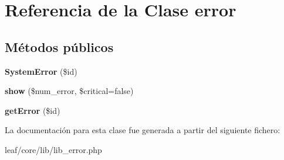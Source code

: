 \hypertarget{classerror}{\section{Referencia de la Clase error}
\label{classerror}
}
\subsection*{Métodos públicos}
\begin{DoxyCompactItemize}
\item 
\hypertarget{classerror_a21fc3cc371f33dd05557d8609113bb2e}{{\bfseries System\-Error} (\$id)}\label{classerror_a21fc3cc371f33dd05557d8609113bb2e}

\item 
\hypertarget{classerror_ae10e319238f18fba0662fa1d2d7335eb}{{\bfseries show} (\$num\-\_\-error, \$critical=false)}\label{classerror_ae10e319238f18fba0662fa1d2d7335eb}

\item 
\hypertarget{classerror_a9c0c3aad490ae5fd6f11e4103761e060}{{\bfseries get\-Error} (\$id)}\label{classerror_a9c0c3aad490ae5fd6f11e4103761e060}

\end{DoxyCompactItemize}


La documentación para esta clase fue generada a partir del siguiente fichero\-:\begin{DoxyCompactItemize}
\item 
leaf/core/lib/lib\-\_\-error.\-php\end{DoxyCompactItemize}
